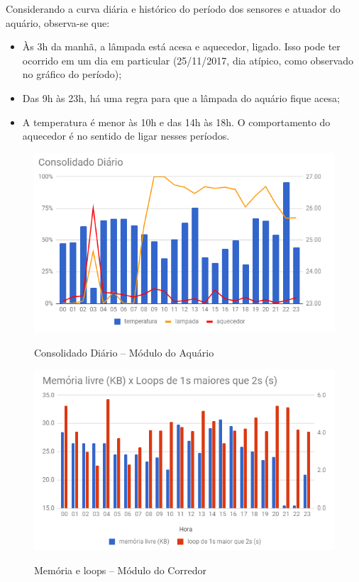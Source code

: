 Considerando a curva diária e histórico do período dos sensores e atuador do aquário, observa-se que:

\begin{itemize}
	\item Às 3h da manhã, a lâmpada está acesa e aquecedor, ligado. Isso pode ter ocorrido em um dia em particular (25/11/2017, dia atípico, como observado no gráfico do período);
	\item Das 9h às 23h, há uma regra para que a lâmpada do aquário fique acesa;
	\item A temperatura é menor às 10h e das 14h às 18h. O comportamento do aquecedor é no sentido de ligar nesses períodos.

\end{itemize}

\begin{figure}[H]
	\centering
	\caption{Consolidado Diário -- Módulo do Aquário}
	\includegraphics[width=1.0\textwidth]{AquaDia}
	\label{fig:AquaDia}
\end{figure}

\begin{figure}[H]
	\centering
	\caption{Memória e loops -- Módulo do Corredor}
	\includegraphics[width=1.0\textwidth]{MemLivreCorredor}
	\label{fig:MemLivreCorredor}
\end{figure}

